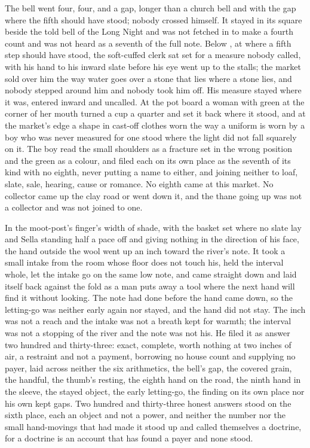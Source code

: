 The bell went four, four, and a gap, longer than a church bell and with the gap where the fifth should have stood; nobody crossed himself. It stayed in its square beside the told bell of the Long Night and was not fetched in to make a fourth count and was not heard as a seventh of the full note. Below , at  where a fifth step should have stood, the soft-cuffed clerk sat set for a measure nobody called, with his hand to his inward slate before his eye went up to the stalls; the market sold over him the way water goes over a stone that lies where a stone lies, and nobody stepped around him and nobody took him off. His measure stayed where it was, entered inward and uncalled. At the pot board a woman with green at the corner of her mouth turned a cup a quarter and set it back where it stood, and at the market's edge a shape in cast-off clothes worn the way a uniform is worn by a boy who was never measured for one stood where the light did not fall squarely on it. The boy read the small shoulders as a fracture set in the wrong position and the green as a colour, and filed each on its own place as the seventh of its kind with no eighth, never putting a name to either, and joining neither to loaf, slate, sale, hearing, cause or romance. No eighth came at this market. No collector came up the clay road or went down it, and the thane going up was not a collector and was not joined to one.

\scenebreak

In the moot-post's finger's width of shade, with the basket set where no slate lay and Sella standing half a pace off and giving nothing in the direction of his face, the hand outside the wool went up an inch toward the river's note. It took a small intake from the room whose floor does not touch his, held the interval whole, let the intake go on the same low note, and came straight down and laid itself back against the fold as a man puts away a tool where the next hand will find it without looking. The note had done before the hand came down, so the letting-go was neither early again nor stayed, and the hand did not stay. The inch was not a reach and the intake was not a breath kept for warmth; the interval was not a stopping of the river and the note was not his. He filed it as answer two hundred and thirty-three: exact, complete, worth nothing at two inches of air, a restraint and not a payment, borrowing no house count and supplying no payer, laid across neither the six arithmetics, the bell's gap, the covered grain, the handful, the thumb's resting, the eighth hand on the road, the ninth hand in the sleeve, the stayed object, the early letting-go, the finding on its own place nor his own kept gaps. Two hundred and thirty-three honest answers stood on the sixth place, each an object and not a power, and neither the number nor the small hand-movings that had made it stood up and called themselves a doctrine, for a doctrine is an account that has found a payer and none stood.

